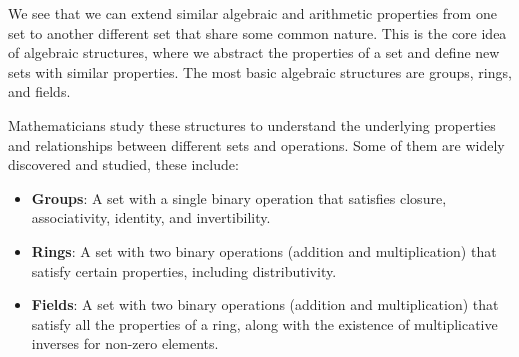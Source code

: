 \documentclass[oneside]{book}
\begin{document}

We see that we can extend similar algebraic and arithmetic properties from one set to another different set that share some common nature. This is the core idea of algebraic structures, where we abstract the properties of a set and define new sets with similar properties. The most basic algebraic structures are groups, rings, and fields.


Mathematicians study these structures to understand the underlying properties and relationships between different sets and operations. Some of them are widely discovered and studied, these include:
\begin{itemize}
	\item \textbf{Groups}: A set with a single binary operation that satisfies closure, associativity, identity, and invertibility.
	\item \textbf{Rings}: A set with two binary operations (addition and multiplication) that satisfy certain properties, including distributivity.
	\item \textbf{Fields}: A set with two binary operations (addition and multiplication) that satisfy all the properties of a ring, along with the existence of multiplicative inverses for non-zero elements.
\end{itemize}
\end{document}
